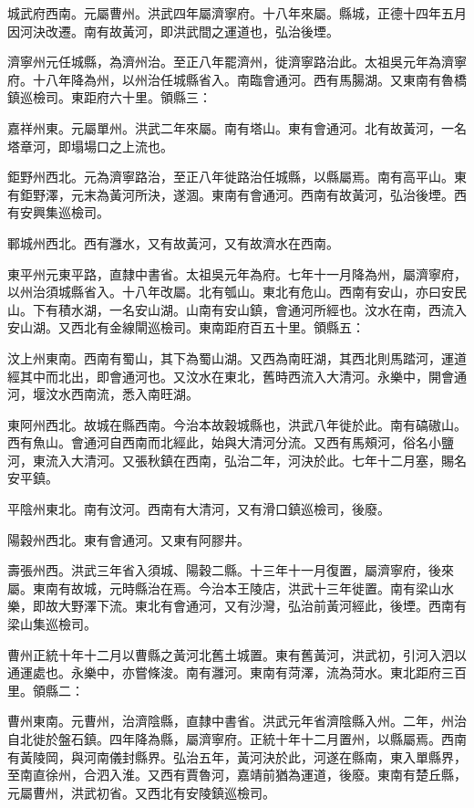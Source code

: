 城武府西南。元屬曹州。洪武四年屬濟寧府。十八年來屬。縣城，正德十四年五月因河決改遷。南有故黃河，即洪武間之運道也，弘治後堙。

濟寧州元任城縣，為濟州治。至正八年罷濟州，徙濟寧路治此。太祖吳元年為濟寧府。十八年降為州，以州治任城縣省入。南臨會通河。西有馬腸湖。又東南有魯橋鎮巡檢司。東距府六十里。領縣三：

嘉祥州東。元屬單州。洪武二年來屬。南有塔山。東有會通河。北有故黃河，一名塔章河，即塌場口之上流也。

鉅野州西北。元為濟寧路治，至正八年徙路治任城縣，以縣屬焉。南有高平山。東有鉅野澤，元末為黃河所決，遂涸。東南有會通河。西南有故黃河，弘治後堙。西有安興集巡檢司。

鄆城州西北。西有灉水，又有故黃河，又有故濟水在西南。

東平州元東平路，直隸中書省。太祖吳元年為府。七年十一月降為州，屬濟寧府，以州治須城縣省入。十八年改屬。北有瓠山。東北有危山。西南有安山，亦曰安民山。下有積水湖，一名安山湖。山南有安山鎮，會通河所經也。汶水在南，西流入安山湖。又西北有金線閘巡檢司。東南距府百五十里。領縣五：

汶上州東南。西南有蜀山，其下為蜀山湖。又西為南旺湖，其西北則馬踏河，運道經其中而北出，即會通河也。又汶水在東北，舊時西流入大清河。永樂中，開會通河，堰汶水西南流，悉入南旺湖。

東阿州西北。故城在縣西南。今治本故穀城縣也，洪武八年徙於此。南有碻磝山。西有魚山。會通河自西南而北經此，始與大清河分流。又西有馬頰河，俗名小鹽河，東流入大清河。又張秋鎮在西南，弘治二年，河決於此。七年十二月塞，賜名安平鎮。

平陰州東北。南有汶河。西南有大清河，又有滑口鎮巡檢司，後廢。

陽穀州西北。東有會通河。又東有阿膠井。

壽張州西。洪武三年省入須城、陽穀二縣。十三年十一月復置，屬濟寧府，後來屬。東南有故城，元時縣治在焉。今治本王陵店，洪武十三年徙置。南有梁山水樂，即故大野澤下流。東北有會通河，又有沙灣，弘治前黃河經此，後堙。西南有梁山集巡檢司。

曹州正統十年十二月以曹縣之黃河北舊土城置。東有舊黃河，洪武初，引河入泗以通運處也。永樂中，亦嘗條浚。南有灉河。東南有菏澤，流為菏水。東北距府三百里。領縣二：

曹州東南。元曹州，治濟陰縣，直隸中書省。洪武元年省濟陰縣入州。二年，州治自北徙於盤石鎮。四年降為縣，屬濟寧府。正統十年十二月置州，以縣屬焉。西南有黃陵岡，與河南儀封縣界。弘治五年，黃河決於此，河遂在縣南，東入單縣界，至南直徐州，合泗入淮。又西有賈魯河，嘉靖前猶為運道，後廢。東南有楚丘縣，元屬曹州，洪武初省。又西北有安陵鎮巡檢司。

